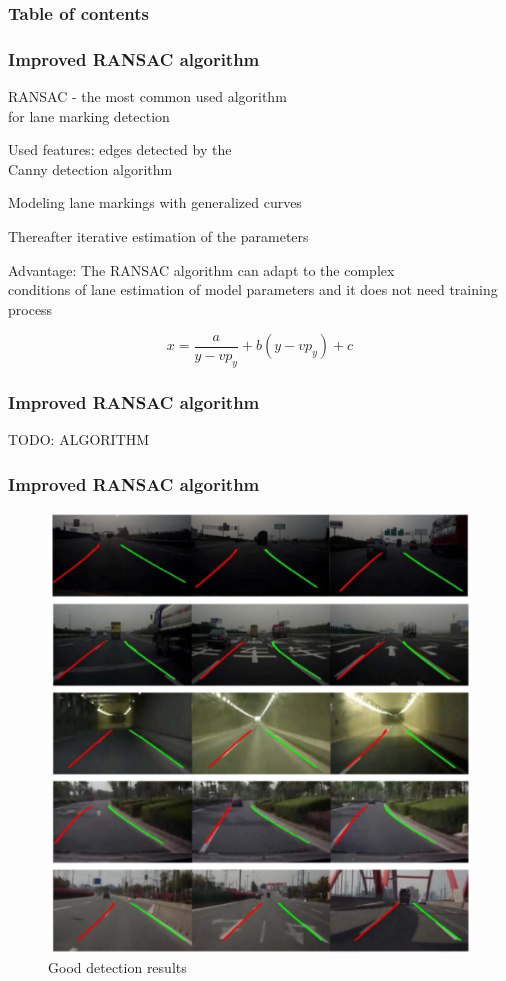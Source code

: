 \documentclass[t]{beamer}
\begin{document}
\frame
{
	\frametitle{Table of contents}
	\tableofcontents[ 
    currentsubsection, 
    sectionstyle=show/hide, 
    subsectionstyle=show/shaded,
    sectionstyle=show/shaded 
    ] 
}

\frame
{
	\frametitle{Improved RANSAC algorithm}
	\itemize
	{
		\item RANSAC - the most common used algorithm\\
		for lane marking detection
		\item Used features: edges detected by the\\
		Canny detection algorithm
		\item Modeling lane markings with generalized curves
		\item Thereafter iterative estimation of the parameters
		\item Advantage: The RANSAC algorithm can adapt to the complex\\ conditions of lane estimation
of model parameters and it does not need training process
	}

	\begin{equation}
	x = \frac{a}{y-vp_y}+b(y-vp_y) +c
	\label{eq1}
	\end{equation}
}



\frame
{
	\frametitle{Improved RANSAC algorithm}
	TODO: ALGORITHM
}

\frame
{
	\frametitle{Improved RANSAC algorithm}
	\begin{figure}[ht]
	\centering
   	\includegraphics[scale = 0.3]{pictures/good_detections.pdf}
	\caption{Good detection results}
	\label{fig5}
	\end{figure}
}
\end{document}
